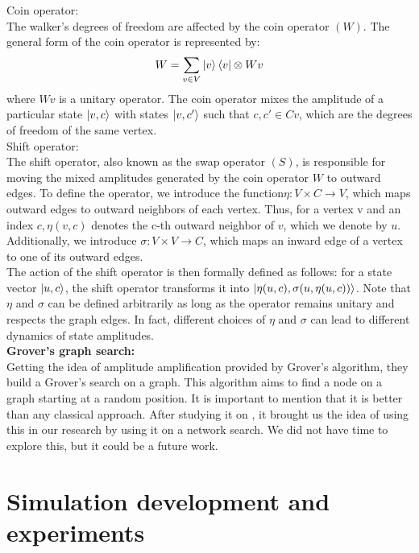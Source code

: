 \documentclass{article}
\begin{document}
    Coin operator:\\
    The walker's degrees of freedom are affected by the coin operator $(W)$. The general form of the coin operator is represented by:\\
    $$W = \sum_{v \in V} \ket{v} \bra{v} \otimes Wv$$ where $Wv$ is a unitary operator. The coin operator mixes the amplitude of a particular state $\ket{v,c}$ with states $\ket{v,c'}$ such that $c, c' \in Cv$, which are the degrees of freedom of the same vertex. \cite{equivalence}\\
    
    Shift operator:\\
    The shift operator, also known as the swap operator $(S)$, is responsible for moving the mixed amplitudes generated by the coin operator $W$ to outward edges. To define the operator, we introduce the function$ \eta: V \times C \to V$, which maps outward edges to outward neighbors of each vertex. Thus, for a vertex v and an index $c, \eta(v, c)$ denotes the c-th outward neighbor of $v$, which we denote by $u$. Additionally, we introduce $\sigma: V \times V \to C$, which maps an inward edge of a vertex to one of its outward edges.\\
    The action of the shift operator is then formally defined as follows: for a state vector $\ket{u,c}$, the shift operator transforms it into $\ket{\eta(u,c), \sigma(u,\eta(u,c))}$. Note that $\eta$ and $\sigma$ can be defined arbitrarily as long as the operator remains unitary and respects the graph edges. In fact, different choices of $\eta$ and $\sigma$ can lead to different dynamics of state amplitudes. \cite{equivalence}\\

    \textbf{Grover's graph search:}\\

        Getting the idea of amplitude amplification provided by Grover's algorithm, they build a Grover's search on a graph. This algorithm aims to find a node on a graph starting at a random position. It is important to mention that it is better than any classical approach. After studying it on \cite{portugal}, it brought us the idea of using this in our research by using it on a network search. We did not have time to explore this, but it could be a future work.\\
    

\section{Simulation development and experiments}
\end{document}

